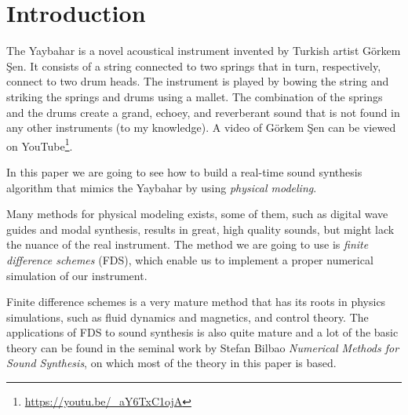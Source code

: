 \documentclass{article}
\title{\papertitle}
\begin{document}
%
\capstartfalse
\maketitle
\capstarttrue
%
\begin{abstract}
Much work has been done on the theoretical aspects of physical modeling for sound synthesis and lots of models exist that can be combined to form larger acoustical systems.
In this paper I use those results to model a specific instrument, the Yaybahar, invented by Turkish artist Görkem Şen.
Each part of the instrument is covered independently and their physics are explained in an intuitive manner.
I then show how each model can be solved numerically using the method of finite difference schemes, which are reviewed briefly.
The models are implemented in C++ to form an interactive, real-time application, whose architecture and optimization is also discussed.
\end{abstract}
%

\section{Introduction}\label{sec:introduction}
\nocite{Someone:00}

The Yaybahar is a novel acoustical instrument invented by Turkish artist Görkem Şen.
It consists of a string connected to two springs that in turn, respectively, connect to two drum heads.
The instrument is played by bowing the string and striking the springs and drums using a mallet.
The combination of the springs and the drums create a grand, echoey, and reverberant sound that is not found in any other instruments (to my knowledge).
A video of Görkem Şen can be viewed on YouTube\footnote{\url{https://youtu.be/_aY6TxC1ojA}}.

In this paper we are going to see how to build a real-time sound synthesis algorithm that mimics the Yaybahar by using \textit{physical modeling}.

Many methods for physical modeling exists, some of them, such as digital wave guides and modal synthesis, results in great, high quality sounds, but might lack the nuance of the real instrument.
The method we are going to use is \textit{finite difference schemes} (FDS), which enable us to implement a proper numerical simulation of our instrument.

Finite difference schemes is a very mature method that has its roots in physics simulations, such as fluid dynamics and magnetics, and control theory.
The applications of FDS to sound synthesis is also quite mature and a lot of the basic theory can be found in the seminal work by Stefan Bilbao \textit{Numerical Methods for Sound Synthesis}\cite{bilbao_numerical_2009}, on which most of the theory in this paper is based.
\end{document}
